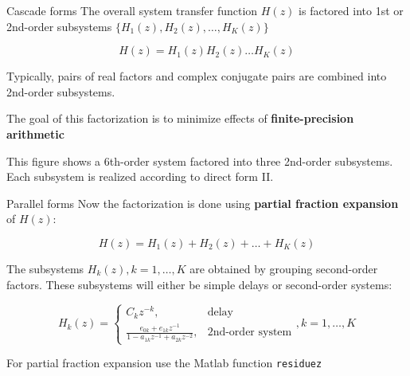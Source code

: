 \documentclass[10pt, handout]{beamer}
\begin{document}
\begin{frame}{Cascade forms}
	The overall system transfer function  $H(z)$ is factored into 1st or 2nd-order subsystems $\{H_1(z),H_2(z),\ldots, H_K(z)\}$
	
	\begin{equation*}
	H(z) = H_1(z)H_2(z)\ldots H_K(z)
	\end{equation*}
	
	Typically, pairs of real factors and complex conjugate pairs are combined into 2nd-order subsystems.
	
	The goal of this factorization is to minimize effects of \textbf{finite-precision arithmetic}
	
\begin{center}
\end{center}

This figure shows a 6th-order system factored into three 2nd-order subsystems. Each subsystem is realized according to direct form II.
\end{frame}

\begin{frame}{Parallel forms}
	Now the factorization is done using \textbf{partial fraction expansion} of $H(z)$:
	
	\begin{equation*}
	H(z) = H_1(z) + H_2(z) + \ldots + H_K(z)
	\end{equation*}
	
	The subsystems $H_k(z), k = 1, \ldots, K$ are obtained by grouping second-order factors. These subsystems will either be simple delays or second-order systems:
	
	\begin{equation*}
	H_k(z) = \begin{cases}
	C_kz^{-k}, & \text{delay} \\
	\displaystyle\frac{e_{0k} + e_{1k}z^{-1}}{1 - a_{1k}z^{-1} + a_{2k}z^{-2}}, & \text{2nd-order system}
	\end{cases}, k = 1,\ldots, K
	\end{equation*}
	
	For partial fraction expansion use the Matlab function \texttt{residuez}
\end{frame}
\end{document}
